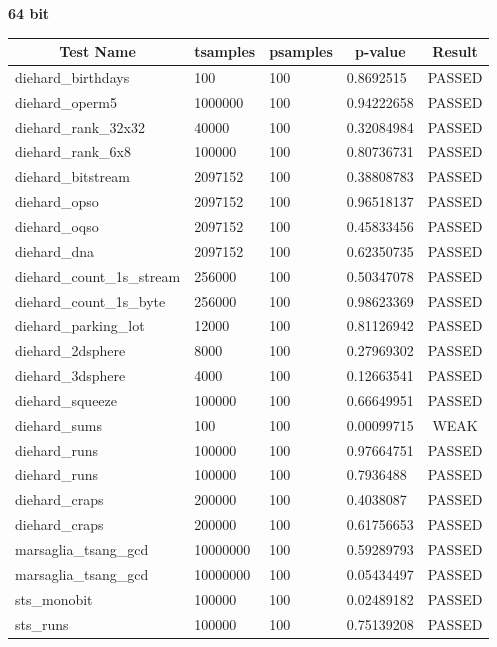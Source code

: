 \documentclass[titlepage, 11pt]{article}
\begin{document}
\newpage
\noindent \textbf{64 bit}
\begin{table}[!htb]
\begin{tabular}{l|l|l|l|c}
\hline
\multicolumn{1}{c|}{\textbf{Test Name}} & \multicolumn{1}{c|}{\textbf{tsamples}} & \multicolumn{1}{c|}{\textbf{psamples}} & \multicolumn{1}{c|}{\textbf{p-value}} & \textbf{Result} \\ \hline
diehard\_birthdays & 100 & 100 & 0.8692515 & PASSED \\
diehard\_operm5 & 1000000 & 100 & 0.94222658 & PASSED \\
diehard\_rank\_32x32 & 40000 & 100 & 0.32084984 & PASSED \\
diehard\_rank\_6x8 & 100000 & 100 & 0.80736731 & PASSED \\
diehard\_bitstream & 2097152 & 100 & 0.38808783 & PASSED \\
diehard\_opso & 2097152 & 100 & 0.96518137 & PASSED \\
diehard\_oqso & 2097152 & 100 & 0.45833456 & PASSED \\
diehard\_dna & 2097152 & 100 & 0.62350735 & PASSED \\
diehard\_count\_1s\_stream & 256000 & 100 & 0.50347078 & PASSED \\
diehard\_count\_1s\_byte & 256000 & 100 & 0.98623369 & PASSED \\
diehard\_parking\_lot & 12000 & 100 & 0.81126942 & PASSED \\
diehard\_2dsphere & 8000 & 100 & 0.27969302 & PASSED \\
diehard\_3dsphere & 4000 & 100 & 0.12663541 & PASSED \\
diehard\_squeeze & 100000 & 100 & 0.66649951 & PASSED \\
diehard\_sums & 100 & 100 & 0.00099715 & WEAK \\
diehard\_runs & 100000 & 100 & 0.97664751 & PASSED \\
diehard\_runs & 100000 & 100 & 0.7936488 & PASSED \\
diehard\_craps & 200000 & 100 & 0.4038087 & PASSED \\
diehard\_craps & 200000 & 100 & 0.61756653 & PASSED \\
marsaglia\_tsang\_gcd & 10000000 & 100 & 0.59289793 & PASSED \\
marsaglia\_tsang\_gcd & 10000000 & 100 & 0.05434497 & PASSED \\
sts\_monobit & 100000 & 100 & 0.02489182 & PASSED \\
sts\_runs & 100000 & 100 & 0.75139208 & PASSED \\

\end{tabular}
\end{table}
\end{document}
